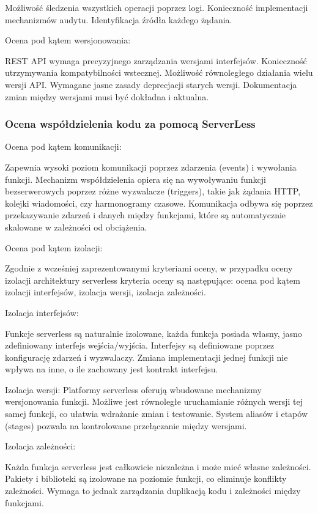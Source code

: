 \documentclass[runningheads,12pt]{llncs}
\begin{document}
Możliwość śledzenia wszystkich operacji poprzez logi. Konieczność implementacji mechanizmów audytu. Identyfikacja źródła każdego żądania. ~\cite[p. 312]{newman2015building}

Ocena pod kątem wersjonowania:

REST API wymaga precyzyjnego zarządzania wersjami interfejsów. Konieczność utrzymywania kompatybilności wstecznej. Możliwość równoległego działania wielu wersji API. Wymagane jasne zasady deprecjacji starych wersji. Dokumentacja zmian między wersjami musi być dokładna i aktualna. ~\cite[p. 134]{richardson2013rest}
\subsubsection{Ocena współdzielenia kodu za pomocą ServerLess}

Ocena pod kątem komunikacji:

Zapewnia wysoki poziom komunikacji poprzez zdarzenia (events) i wywołania funkcji. Mechanizm współdzielenia opiera się na wywoływaniu funkcji bezserwerowych poprzez różne wyzwalacze (triggers), takie jak żądania HTTP, kolejki wiadomości, czy harmonogramy czasowe. Komunikacja odbywa się poprzez przekazywanie zdarzeń i danych między funkcjami, które są automatycznie skalowane w zależności od obciążenia. ~\cite[p. 45]{roberts2018cloud}

Ocena pod kątem izolacji:

Zgodnie z wcześniej zaprezentowanymi kryteriami oceny, w przypadku oceny izolacji architektury serverless kryteria oceny są następujące: ocena pod kątem izolacji interfejsów, izolacja wersji, izolacja zależności.

Izolacja interfejsów:

Funkcje serverless są naturalnie izolowane, każda funkcja posiada własny, jasno zdefiniowany interfejs wejścia/wyjścia. Interfejsy są definiowane poprzez konfigurację zdarzeń i wyzwalaczy. Zmiana implementacji jednej funkcji nie wpływa na inne, o ile zachowany jest kontrakt interfejsu. ~\cite[p. 78]{roberts2018cloud}

Izolacja wersji:
Platformy serverless oferują wbudowane mechanizmy wersjonowania funkcji. Możliwe jest równoległe uruchamianie różnych wersji tej samej funkcji, co ułatwia wdrażanie zmian i testowanie. System aliasów i etapów (stages) pozwala na kontrolowane przełączanie między wersjami. ~\cite[p. 112]{roberts2018cloud}

Izolacja zależności:

Każda funkcja serverless jest całkowicie niezależna i może mieć własne zależności. Pakiety i biblioteki są izolowane na poziomie funkcji, co eliminuje konflikty zależności. Wymaga to jednak zarządzania duplikacją kodu i zależności między funkcjami. ~\cite[p. 156]{roberts2018cloud}
\end{document}
